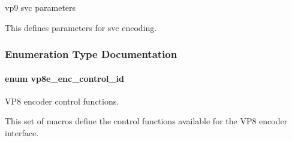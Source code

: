 vp9 svc parameters 

This defines parameters for svc encoding. 

\subsubsection{Enumeration Type Documentation}
\hypertarget{group__vp8__encoder_ga6deae3d561c838952552c3d3756322ec}{
\paragraph[{vp8e\+\_\+enc\+\_\+control\+\_\+id}]{\setlength{\rightskip}{0pt plus 5cm}enum {\bf vp8e\+\_\+enc\+\_\+control\+\_\+id}}}\label{group__vp8__encoder_ga6deae3d561c838952552c3d3756322ec}


V\+P8 encoder control functions. 

This set of macros define the control functions available for the V\+P8 encoder interface.

